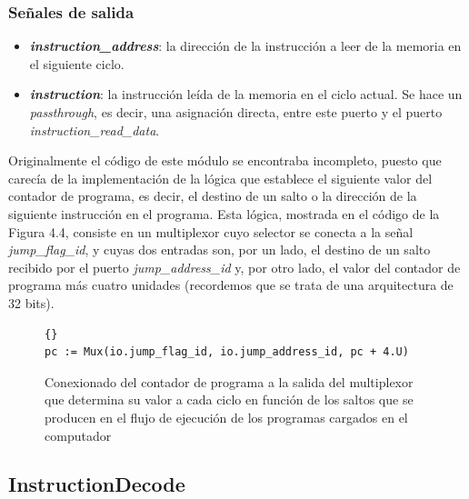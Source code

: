 \subsubsection{Señales de salida}

\begin{itemize}
  \item \textbf{\textit{instruction\_address}}: la dirección de la instrucción a leer de la memoria en el siguiente ciclo.
  \vspace{-0.2cm}
  \item \textbf{\textit{instruction}}: la instrucción leída de la memoria en el ciclo actual. Se hace un \textit{passthrough}, es decir, una asignación directa, entre este puerto y el puerto \textit{instruction\_read\_data}.
\end{itemize}

Originalmente el código de este módulo se encontraba incompleto, puesto que carecía de la implementación de la lógica que establece el siguiente valor del contador de programa, es decir, el destino de un salto o la dirección de la siguiente instrucción en el programa. Esta lógica, mostrada en el código de la Figura 4.4, consiste en un multiplexor cuyo selector se conecta a la señal \textit{jump\_flag\_id}, y cuyas dos entradas son, por un lado, el destino de un salto recibido por el puerto \textit{jump\_address\_id} y, por otro lado, el valor del contador de programa más cuatro unidades (recordemos que se trata de una arquitectura de 32 bits).

\vspace{+0.3cm}
\begin{figure}[h]
  \centering
  \begin{minipage}{0.9\linewidth}
    \begin{lstlisting}[style=scalaStyle]{}
pc := Mux(io.jump_flag_id, io.jump_address_id, pc + 4.U)
    \end{lstlisting}
    \caption{Conexionado del contador de programa a la salida del multiplexor que determina su valor a cada ciclo en función de los saltos que se producen en el flujo de ejecución de los programas cargados en el computador}
  \end{minipage}
\end{figure}

\subsection{InstructionDecode}

